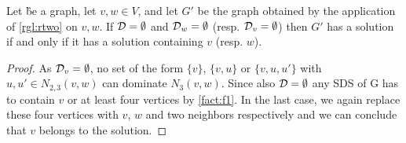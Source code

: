 \begin{fact}\label{fact:f2}
    Let \G be a graph, let $v,w \in V$, and let $G'$ be the graph obtained by the application of \cref{rgl:rtwo} on $v, w$. If $\mathcal{D} = \emptyset$ and $\mathcal{D}_{w} = \emptyset$ (resp. $\mathcal{D}_{v} = \emptyset$) then $G'$ has a solution if and only if it has a solution containing $v$ (resp. $w$).
\end{fact}
\begin{proof}
As $\mathcal{D}_{v} = \emptyset$, no set of the form $\{v\}$, $\{v, u\}$ or $\{v, u, u'\}$ with $u, u' \in N_{2,3}(v,w)$ can dominate $N_3(v,w)$. Since also $\mathcal{D} = \emptyset$ any SDS of G has to contain $v$ or at least four vertices by \cref{fact:f1}. In the last case, we again replace these four vertices with $v$, $w$ and two neighbors respectively and we can conclude that $v$ belongs to the solution.
\end{proof}


